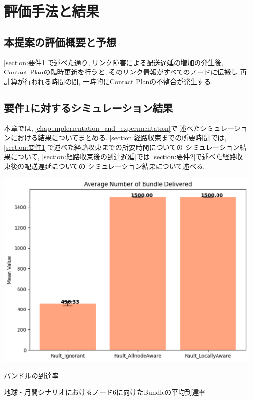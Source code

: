 \chapter{評価手法と結果}
\label{chap:evaluation}
\section{本提案の評価概要と予想}
\ref{section:要件1}で述べた通り, リンク障害による配送遅延の増加の発生後, 
Contact Planの臨時更新を行うと, そのリンク情報がすべてのノードに伝搬し
再計算が行われる時間の間, 一時的にContact Planの不整合が発生する. 

\section{要件1に対するシミュレーション結果}
\label{section:要件1に対するシミュレーション結果}
本章では, \ref{chap:implementation_and_experimentation}で
述べたシミュレーションにおける結果についてまとめる. 
\ref{section:経路収束までの所要時間}では, 
\ref{section:要件1}で述べた経路収束までの所要時間についての
シミュレーション結果について, \ref{section:経路収束後の到達遅延}では
\ref{section:要件2}で述べた経路収束後の配送遅延についての
シミュレーション結果について述べる. 


\begin{table}[tbh]
    \centering
    \includegraphics[width=0.7\textheight]{results/results_20250116/moon_bundle.pdf}
    \caption{バンドルの到達率}
    \label{fig:graph_bundle_earth_moon}
    \begin{minipage}{\textwidth}
        \centering
        \vspace{3mm}
        地球・月間シナリオにおけるノード6に向けたBundleの平均到達率
    \end{minipage}
\end{table}

